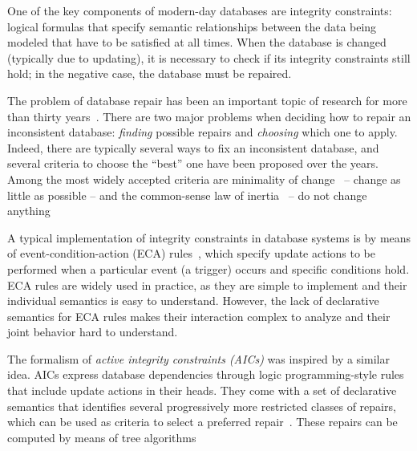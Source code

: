 
One of the key components of modern-day databases are integrity constraints: logical formulas that specify semantic relationships between the data being modeled that have to be satisfied at all times.
When the database is changed (typically due to updating), it is necessary to check if its integrity constraints still hold; in the negative case, the database must be repaired.

The problem of database repair has been an important topic of research for more than thirty years~\cite{icdt/Abiteboul88}.
There are two major problems when deciding how to repair an inconsistent database: \emph{finding} possible repairs and \emph{choosing} which one to apply.
Indeed, there are typically several ways to fix an inconsistent database, and several criteria to choose the ``best'' one have been proposed over the years.
Among the most widely accepted criteria are minimality of change~\cite{Winslett90,ai/EiterG92} -- change as little as possible -- and the common-sense law of inertia~\cite[discussed in, e.g.,][]{PrzymusinskiT97} -- do not change anything 

A typical implementation of integrity constraints in database systems is by means of event-condition-action (ECA) rules~\cite{TenienteO95,WidomC96}, which specify update actions to be performed when a particular event (a trigger) occurs and specific conditions hold.
ECA rules are widely used in practice, as they are simple to implement and their individual semantics is easy to understand.
However, the lack of declarative semantics for ECA rules makes their interaction complex to analyze and their joint behavior hard to understand.

The formalism of \emph{active integrity constraints (AICs)} \cite{ppdp/FlescaGZ04} was inspired by a similar idea.
AICs express database dependencies through logic programming-style rules that include update actions in their heads.
They come with a set of declarative semantics that identifies several progressively more restricted classes of repairs, which can be used as criteria to select a preferred repair~\cite{tplp/CaropreseT11}.
These repairs can be computed by means of tree algorithms

